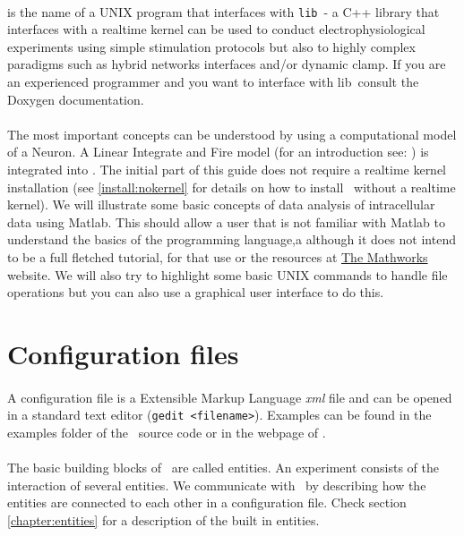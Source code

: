 \paragraph{}
\textbf{\progname} is the name of a UNIX program that interfaces with \texttt{lib\progname}\  - a C++ library that interfaces with a realtime kernel can be used to conduct electrophysiological experiments using simple stimulation protocols but also to highly complex paradigms such as hybrid networks interfaces and/or dynamic clamp. If you are an experienced programmer and you want to interface with lib\progname\, consult the Doxygen documentation.

\paragraph{}
The most important concepts can be understood by using a computational model of a Neuron. A Linear Integrate and Fire model (for an introduction see: \cite{Koch:1989}) is integrated into \progname. The initial part of this guide does not require a realtime kernel installation (see \ref{install:nokernel} for details on how to install \progname\ without a realtime kernel).
We will illustrate some basic concepts of data analysis of intracellular data using Matlab. This should allow a user that is not familiar with Matlab to understand the basics of the programming language,a although it does not intend to be a full fletched tutorial, for that use \cite{wallisch2011} or the resources at \href{http://www.mathworks.com}{The Mathworks} website. We will also try to highlight some basic UNIX commands to handle file operations but you can also use a graphical user interface to do this. 

\section{Configuration files}
\paragraph{}
A configuration file is a Extensible Markup Language \emph{xml} file and can be opened in a standard text editor (\texttt{gedit <filename>}). Examples can be found in the examples folder of the \progname\ source code or in the webpage of \href{http://www.tnb.ua.ac.be}{\progname}.

\paragraph{}
The basic building blocks of \progname\ are called entities. An experiment consists of the interaction of several entities. We communicate with \progname\ by describing how the entities are connected to each other in a configuration file. Check section \ref{chapter:entities} for a description of the built in entities.

